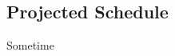\begin{appendices}

\chapter{Projected Schedule}
\begin{subappendices}
Sometime
\end{subappendices}

\end{appendices}
